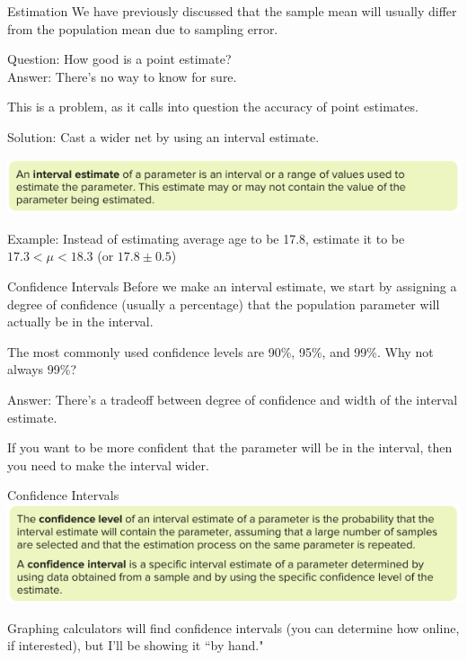 \documentclass[t, aspectratio=169]{beamer}
\newcommand{\?}{\stackrel{?}{=}}
\begin{document}
	\begin{frame}{Estimation}
		We have previously discussed that the sample mean will usually differ from the population mean due to sampling error. \pause
		
		Question: How good is a point estimate? \pause \\
		Answer: There's no way to know for sure. \pause
		
		This is a problem, as it calls into question the accuracy of point estimates. \pause
		
		Solution: Cast a wider net by using an interval estimate. \pause
		
		\includegraphics[width=\textwidth]{ie-def.png} \pause
		
		Example: Instead of estimating average age to be 17.8, estimate it to be $17.3 < \mu < 18.3$ (or $17.8 \pm 0.5$)
	\end{frame}

	\begin{frame}{Confidence Intervals}
		Before we make an interval estimate, we start by assigning a degree of confidence (usually a percentage) that the population parameter will actually be in the interval. \pause
		
		The most commonly used confidence levels are 90\%, 95\%, and 99\%. \pause Why not always 99\%? \pause
		
		Answer: There's a tradeoff between degree of confidence and width of the interval estimate. \pause
		
		If you want to be more confident that the parameter will be in the interval, then you need to make the interval wider. \pause 
	\end{frame}

	\begin{frame}{Confidence Intervals}
		\includegraphics[width=\textwidth]{conf-defs.png} \pause
		
		Graphing calculators will find confidence intervals (you can determine how online, if interested), but I'll be showing it ``by hand."
	\end{frame}
\end{document}

